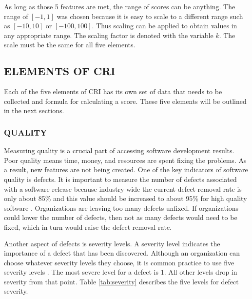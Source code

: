 \documentclass[SDSUThesis.tex]{subfiles}
\begin{document}
    As long as those 5 features are met, the range of scores can be anything.  
    The range of $[-1,1]$ was chosen because it is easy to scale 
    to a different range such as $[-10,10]$ or $[-100,100]$.  
    Thus scaling can be applied to obtain values in any appropriate range. 
    The scaling factor is denoted with the variable $k$.  
    The scale must be the same
    for all five elements.
    
    \subsection{ELEMENTS OF CRI}
        Each of the five elements of CRI has its own set of data that needs to
        be collected and formula for calculating a score. 
        These five elements will be outlined in the next sections.
        
        \subsubsection{QUALITY}
            Measuring quality is a crucial part of accessing 
            software development results.  
            Poor quality means time, money, and resources are spent 
            fixing the problems. As a result, new features are not being
            created. One of the key indicators of software quality 
            is defects.  It is important
            to measure the number of defects associated with a software 
            release because industry-wide the current defect removal rate is only 
            about 85\% and this value should be increased to 
            about 95\% for high quality software \cite{Jones2009}. 
            Organizations are leaving too many defects unfixed.  If organizations
            could lower the number of defects, then not as many defects would
            need to be fixed, which in turn would raise the defect removal rate.
            
            Another aspect of defects is severity levels.  A severity level indicates
            the importance of a defect that has been discovered.  Although an
            organization can choose whatever severity levels they choose, it is
            common practice to use five severity levels \cite{Raynus1999}.  The most 
            severe level for a defect is 1.  All other levels drop in severity 
            from that point. Table \ref{tab:severity} describes the five levels
            for defect severity.  
\end{document}
